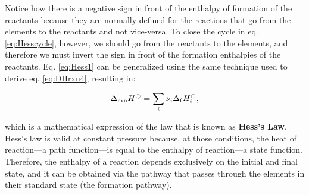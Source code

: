 \documentclass[
  9pt,
]{extbook}
\theoremstyle{definition}
\theoremstyle{definition}
\theoremstyle{definition}
\theoremstyle{definition}
\theoremstyle{remark}
\begin{document}
Notice how there is a negative sign in front of the enthalpy of formation of the reactants because they are normally defined for the reactions that go from the elements to the reactants and not vice-versa. To close the cycle in eq. \eqref{eq:Hesscycle}, however, we should go from the reactants to the elements, and therefore we must invert the sign in front of the formation enthalpies of the reactants. Eq. \eqref{eq:Hess1} can be generalized using the same technique used to derive eq. \eqref{eq:DHrxn4}, resulting in:

\begin{equation}
  \Delta_{\text{rxn}} H^{-\kern-6pt{\ominus}\kern-6pt-}= \sum_i \nu_i \Delta_{\mathrm{f}} H_i^{-\kern-6pt{\ominus}\kern-6pt-},
  \label{eq:Hess}
\end{equation}

which is a mathematical expression of the law that is known as \textbf{Hess's Law}. Hess's law is valid at constant pressure because, at those conditions, the heat of reaction---a path function---is equal to the enthalpy of reaction---a state function. Therefore, the enthalpy of a reaction depends exclusively on the initial and final state, and it can be obtained via the pathway that passes through the elements in their standard state (the formation pathway).
\end{document}
